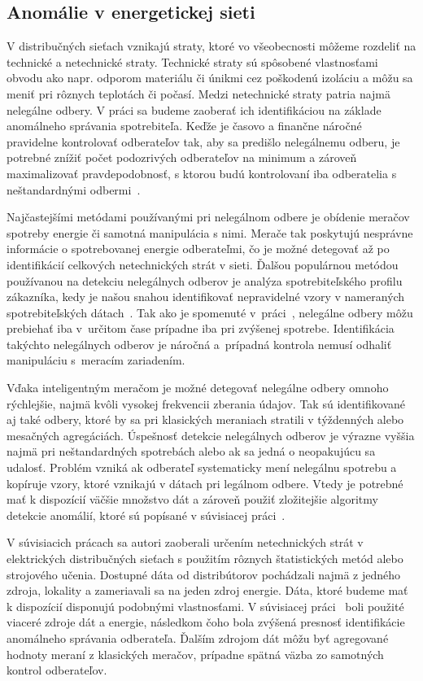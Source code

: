 \documentclass[a4paper,twoside,slovak,12pt]{article}
\begin{document}
\subsection{Anomálie v energetickej sieti}
V distribučných sieťach vznikajú straty, ktoré vo všeobecnosti môžeme rozdeliť
na technické a netechnické straty. Technické straty sú spôsobené vlastnosťami
obvodu ako napr. odporom materiálu či únikmi cez poškodenú izoláciu a môžu sa
meniť pri rôznych teplotách či počasí. Medzi netechnické straty patria najmä
nelegálne odbery. V práci sa budeme zaoberať ich identifikáciou na základe
anomálneho správania spotrebiteľa. Keďže je časovo a finančne náročné
pravidelne kontrolovať odberateľov tak, aby sa predišlo nelegálnemu odberu,
je potrebné znížiť počet podozrivých odberateľov na minimum a zároveň
maximalizovať pravdepodobnosť, s ktorou budú kontrolovaní iba odberatelia
s neštandardnými odbermi~\cite{Coma-Puig2016,Sahoo2015}.

Najčastejšími metódami používanými pri nelegálnom odbere je obídenie meračov
spotreby energie či samotná manipulácia s nimi. Merače tak poskytujú nesprávne
informácie o spotrebovanej energie odberateľmi, čo je možné detegovať až po
identifikácií celkových netechnických strát v sieti. Ďalšou populárnou metódou
používanou na detekciu nelegálnych odberov je analýza spotrebiteľského
profilu zákazníka, kedy je našou snahou identifikovať nepravidelné vzory
v nameraných spotrebiteľských dátach~\cite{Sahoo2015}. Tak ako je spomenuté
v~práci~\cite{Depuru2012}, nelegálne odbery môžu prebiehať iba v~určitom čase
prípadne iba pri zvýšenej spotrebe. Identifikácia takýchto nelegálnych odberov
je náročná a~prípadná kontrola nemusí odhaliť manipuláciu s~meracím zariadením.

Vďaka inteligentným meračom je možné detegovať nelegálne odbery omnoho
rýchlejšie, najmä kvôli vysokej frekvencii zberania údajov. Tak sú
identifikované aj také odbery, ktoré by sa pri klasických meraniach stratili
v týždenných alebo mesačných agregáciách. Úspešnosť detekcie nelegálnych odberov
je výrazne vyššia najmä pri neštandardných spotrebách alebo ak sa jedná
o neopakujúcu sa udalosť. Problém vzniká ak odberateľ systematicky mení
nelegálnu spotrebu a kopíruje vzory, ktoré vznikajú v dátach pri legálnom
odbere. Vtedy je potrebné mať k dispozícií väčšie množstvo dát a zároveň použiť
zložitejšie algoritmy detekcie anomálií, ktoré sú popísané v súvisiacej
práci~\cite{Nikovski2013}.

V súvisiacich prácach sa autori zaoberali určením netechnických strát
v elektrických distribučných sieťach s použitím rôznych štatistických metód
alebo strojového učenia. Dostupné dáta od distribútorov pochádzali najmä z
jedného zdroja, lokality a zameriavali sa na jeden zdroj energie. Dáta, ktoré
budeme mať k dispozícií disponujú podobnými vlastnosťami. V súvisiacej
práci~\cite{Coma-Puig2016} boli použité viaceré zdroje dát a energie, následkom
čoho bola zvýšená presnosť identifikácie anomálneho správania odberateľa.
Ďalším zdrojom dát môžu byť agregované hodnoty meraní z klasických meračov,
prípadne spätná väzba zo samotných kontrol odberateľov.
\end{document}
